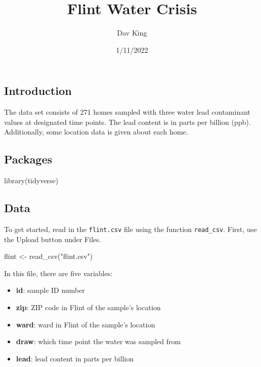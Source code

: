 \documentclass[
]{article}
\title{Flint Water Crisis}
\author{Dav King}
\date{1/11/2022}
\newenvironment{Shaded}{\begin{snugshade}}{\end{snugshade}}
\newcommand{\FunctionTok}[1]{\textcolor[rgb]{0.00,0.00,0.00}{#1}}
\newcommand{\NormalTok}[1]{#1}
\newcommand{\OtherTok}[1]{\textcolor[rgb]{0.56,0.35,0.01}{#1}}
\newcommand{\StringTok}[1]{\textcolor[rgb]{0.31,0.60,0.02}{#1}}
\providecommand{\tightlist}{%
  \setlength{\itemsep}{0pt}\setlength{\parskip}{0pt}}
\begin{document}
\maketitle

\hypertarget{introduction}{%
\subsection{Introduction}\label{introduction}}

The data set consists of 271 homes sampled with three water lead
contaminant values at designated time points. The lead content is in
parts per billion (ppb). Additionally, some location data is given about
each home.

\hypertarget{packages}{%
\subsection{Packages}\label{packages}}

\begin{Shaded}
\begin{Highlighting}[]
\FunctionTok{library}\NormalTok{(tidyverse)}
\end{Highlighting}
\end{Shaded}

\hypertarget{data}{%
\subsection{Data}\label{data}}

To get started, read in the \texttt{flint.csv} file using the function
\texttt{read\_csv}. First, use the Upload button under Files.

\begin{Shaded}
\begin{Highlighting}[]
\NormalTok{flint }\OtherTok{\textless{}{-}} \FunctionTok{read\_csv}\NormalTok{(}\StringTok{"flint.csv"}\NormalTok{)}
\end{Highlighting}
\end{Shaded}

In this file, there are five variables:

\begin{itemize}
\tightlist
\item
  \textbf{id}: sample ID number
\item
  \textbf{zip}: ZIP code in Flint of the sample's location
\item
  \textbf{ward}: ward in Flint of the sample's location
\item
  \textbf{draw}: which time point the water was sampled from
\item
  \textbf{lead}: lead content in parts per billion
\end{itemize}
\end{document}
